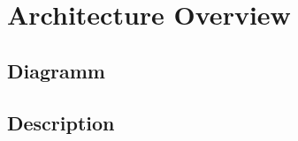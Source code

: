 \documentclass[main.tex]{subfiles}
\begin{document}
	\begingroup

	\renewcommand{\cleardoublepage}{}

	\renewcommand{\clearpage}{}

	\chapter{Architecture Overview}

		\chapterauthor{}
		
		\section{Diagramm}
		
		
		\section{Description}
	  	

	\endgroup
\end{document}
